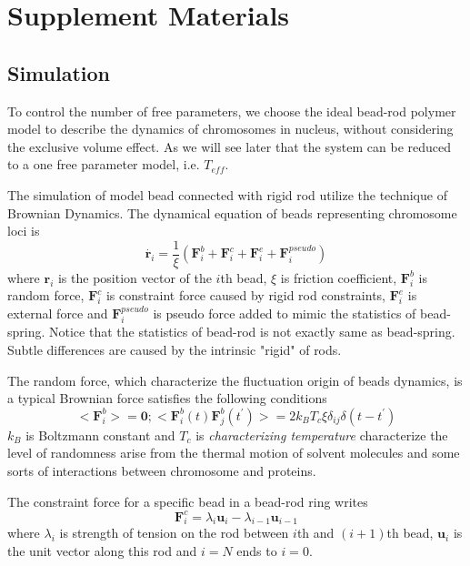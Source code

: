\documentclass{article}
\begin{document}
\section{Supplement Materials}

\subsection{Simulation}
\label{sub:simulation}
To control the number of free parameters, we choose the ideal bead-rod polymer model to describe the dynamics of chromosomes in nucleus, without considering the exclusive volume effect. 
As we will see later that the system can be reduced to a one free parameter model, i.e. $T_{eff}$.  

The simulation of model bead connected with rigid rod utilize the technique of Brownian Dynamics\cite{Cruz2012}.
The dynamical equation of beads representing chromosome loci is
\begin{equation}
	\label{eq:differential}
	\dot{\mathbf{r}_i} = \frac{1}{\xi}(\mathbf{F}_i^b + \mathbf{F}_i^c + \mathbf{F}_i^e + \mathbf{F}_i^{pseudo}) 
\end{equation}
where $\mathbf{r}_i$ is the position vector of the $i$th bead, $\xi$ is friction coefficient, $\mathbf{F}_i^b$ is random force, $\mathbf{F}_i^c$ is constraint force caused by rigid rod constraints, $\mathbf{F}_i^e$ is external force and $\mathbf{F}_i^{pseudo}$ is pseudo force added to mimic the statistics of bead-spring. 
Notice that the statistics of bead-rod is not exactly same as bead-spring. Subtle differences are caused by the intrinsic "rigid" of rods\cite{Hinch1994,Cruz2012}.

The random force, which characterize the fluctuation origin of beads dynamics, is a typical Brownian force satisfies the following conditions
\begin{equation}
	<\mathbf{F}_i^b> = \mathbf{0}; <\mathbf{F}_i^b(t)\mathbf{F}_j^b(t^{\prime})> = 2k_B T_{c} \xi \delta_{ij} \delta(t-t^{\prime})
\end{equation}
$k_B$ is Boltzmann constant and $T_{c}$ is \emph{characterizing temperature} characterize the level of randomness arise from the thermal motion of solvent molecules and some sorts of interactions between chromosome and proteins.

The constraint force for a specific bead in a bead-rod ring writes
\begin{equation}
	\mathbf{F}_i^c = \lambda_i \mathbf{u}_i - \lambda_{i-1} \mathbf{u}_{i-1}
\end{equation}
where $\lambda_i$ is strength of tension on the rod between $i$th and $(i+1)$th bead, $\mathbf{u}_i$ is the unit vector along this rod and $i=N$ ends to $i=0$.
\end{document}
